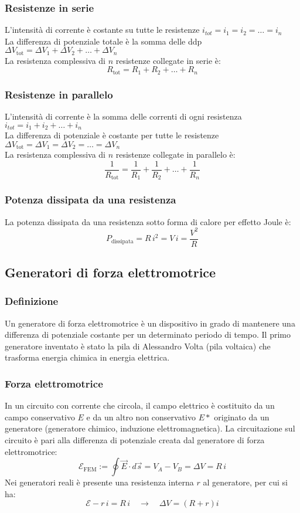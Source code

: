 \documentclass[a4paper]{article}
\begin{document}
\subsubsection*{Resistenze in serie}
L'intensità di corrente è costante su tutte le resistenze \(i_{tot} = i_1 = i_2 = \dots = i_n\) \\
La differenza di potenziale totale è la somma delle ddp \(\Delta V_\text{tot} = \Delta V_1 + \Delta V_2 + \dots + \Delta V_n\) \\
La resistenza complessiva di \(n\) resistenze collegate in serie è:
\[R_\text{tot} = R_1 + R_2 + \dots + R_n\]

\subsubsection*{Resistenze in parallelo}
L'intensità di corrente è la somma delle correnti di ogni resistenza \(i_{tot} = i_1 + i_2 + \dots + i_n\) \\
La differenza di potenziale è costante per tutte le resistenze \(\Delta V_\text{tot} = \Delta V_1 = \Delta V_2 = \dots = \Delta V_n\) \\
La resistenza complessiva di \(n\) resistenze collegate in parallelo è:
\[\frac{1}{R_\text{tot}} = \frac{1}{R_1}+ \frac{1}{R_2} + \dots + \frac{1}{R_n}\]

\subsubsection*{Potenza dissipata da una resistenza}
La potenza dissipata da una resistenza sotto forma di calore per effetto Joule è:
\[P_\text{dissipata} = R \, i^2 = V \, i = \frac{V^2}{R}\]

\newpage

\subsection{Generatori di forza elettromotrice}
\subsubsection*{Definizione}
Un generatore di forza elettromotrice è un dispositivo in grado di mantenere una differenza di potenziale costante per un determinato
periodo di tempo. Il primo generatore inventato è stato la pila di Alessandro Volta (pila voltaica) che trasforma energia chimica in
energia elettrica.

\subsubsection*{Forza elettromotrice}
In un circuito con corrente che circola, il campo elettrico è costituito da un campo conservativo \(E\) e da un altro non conservativo
\(E*\) originato da un generatore (generatore chimico, induzione elettromagnetica). La circuitazione sul circuito è pari alla
differenza di potenziale creata dal generatore di forza elettromotrice:
\[\mathcal{E}_\text{FEM} := \oint \vec{E} \cdot d\vec{s} = V_A - V_B = \Delta V = R \, i\]
Nei generatori reali è presente una resistenza interna \(r\) al generatore, per cui si ha:
\[\mathcal{E} - r \, i = R \, i \quad \rightarrow \quad \Delta V = (R + r) i\]
\end{document}
